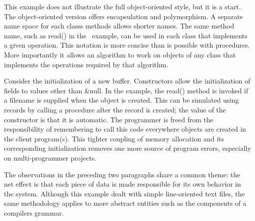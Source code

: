 
This example does not illustrate the full object-oriented style, but it
is a start. The object-oriented version offers encapsulation and
polymorphism. A separate name space for each class{\textquotesingle}s
methods allows shorter names. The same method name, such as
\textsf{read()} in the \ example, can be used in each class that
implements a given operation. This notation is more concise than is
possible with procedures. More importantly it allows an algorithm to
work on objects of any class that implements the operations required by
that algorithm. 

Consider the initialization of a new buffer. Constructors allow the
initialization of fields to values other than \textsf{\&null}. In the
example, the \textsf{read()} method is invoked if a filename is
supplied when the object is created. This can be simulated using
records by calling a procedure after the record is created; the value
of the constructor is that it is automatic.
The programmer is freed from the responsibility of remembering to call
this code everywhere objects are created in the client program(s). This
tighter coupling of memory allocation and its
corresponding initialization removes one more source of program errors,
especially on multi-programmer projects. 

The observations in the preceding two paragraphs share a common theme:
the net effect is that each piece of data is made responsible for its
own behavior in the system. Although this example dealt with simple
line-oriented text files, the same methodology applies to more abstract
entities such as the components of a
compiler{\textquotesingle}s grammar.

